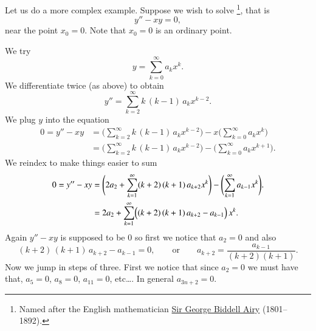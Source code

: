 \documentclass[12pt]{book}
\begin{document}
\begin{example}
Let us do a more complex example.  Suppose we wish to solve
\emph{}%
\footnote{Named after the English mathematician
\href{http://en.wikipedia.org/wiki/George_Biddell_Airy}{Sir George Biddell Airy}
(1801--1892).}, that is
\begin{equation*}
y'' - xy = 0 ,
\end{equation*}
near the point $x_0 = 0$.  Note that $x_0 = 0$ is an ordinary point.

We try
\begin{equation*}
y = \sum_{k=0}^\infty a_k x^k .
\end{equation*}
We differentiate twice (as above) to obtain
\begin{equation*}
y'' = \sum_{k=2}^\infty k\,(k-1) \, a_k x^{k-2} .
\end{equation*}
We plug $y$ into the equation
\begin{equation*}
\begin{split}
0 = y''-xy &= 
\Biggl( \sum_{k=2}^\infty k\,(k-1) \, a_k x^{k-2}  \Biggr)
-
x
\Biggl( \sum_{k=0}^\infty a_k x^k \Biggr)
\\
&=
\Biggl( \sum_{k=2}^\infty k\,(k-1) \, a_k x^{k-2}  \Biggr)
-
\Biggl( \sum_{k=0}^\infty a_k x^{k+1} \Biggr) .
\end{split}
\end{equation*}
We reindex to make things easier to sum
\begin{equation*}
\begin{split}
0 = y''-xy
&= 
\Biggl( 2 a_2 + \sum_{k=1}^\infty (k+2)\,(k+1) \, a_{k+2} x^k  \Biggr)
-
\Biggl( \sum_{k=1}^\infty a_{k-1} x^k \Biggr) .
\\
&= 
2 a_2 + 
\sum_{k=1}^\infty \Bigl( (k+2)\,(k+1) \, a_{k+2} - a_{k-1} \Bigr) \, x^k .
\end{split}
\end{equation*}
Again $y''-xy$ is supposed to be 0 so first we notice that $a_2 = 0$
and also
\begin{equation*}
(k+2)\,(k+1) \,a_{k+2} - a_{k-1} = 0 ,
\qquad
\text{or}
\qquad
a_{k+2} = \frac{a_{k-1}}{(k+2)(k+1)} .
\end{equation*}
Now we jump in steps of three.  First we notice that since $a_2 = 0$
we must have that, $a_5 = 0$, $a_8 = 0$, $a_{11}=0$, etc\ldots.
In general $a_{3n+2} = 0$.


\end{example}
\end{document}
